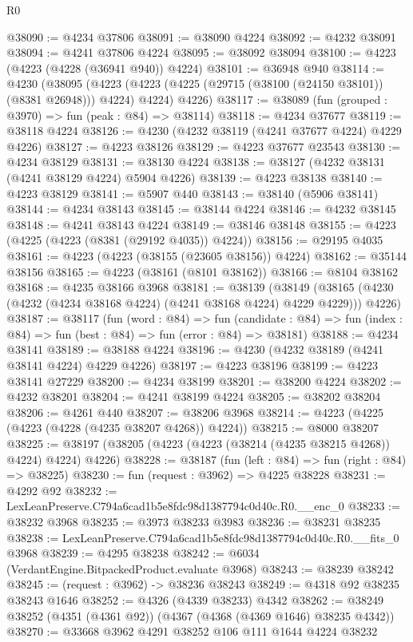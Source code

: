 \begin{lexlean}{R0}
\begin{coremodule}
@38090 := @4234 @37806
@38091 := @38090 @4224
@38092 := @4232 @38091
@38094 := @4241 @37806 @4224
@38095 := @38092 @38094
@38100 := @4223 (@4223 (@4228 (@36941 @940)) @4224)
@38101 := @36948 @940
@38114 := @4230
    (@38095
      (@4223 (@4223 (@4225 (@29715 (@38100 (@24150 @38101)) (@8381 @26948))) @4224) @4224)
      @4226)
@38117 := @38089 (fun (grouped : @3970) => fun (peak : @84) => @38114)
@38118 := @4234 @37677
@38119 := @38118 @4224
@38126 := @4230 (@4232 @38119 (@4241 @37677 @4224) @4229 @4226)
@38127 := @4223 @38126
@38129 := @4223 @37677 @23543
@38130 := @4234 @38129
@38131 := @38130 @4224
@38138 := @38127 (@4232 @38131 (@4241 @38129 @4224) @5904 @4226)
@38139 := @4223 @38138
@38140 := @4223 @38129
@38141 := @5907 @440
@38143 := @38140 (@5906 @38141)
@38144 := @4234 @38143
@38145 := @38144 @4224
@38146 := @4232 @38145
@38148 := @4241 @38143 @4224
@38149 := @38146 @38148
@38155 := @4223 (@4225 (@4223 (@8381 (@29192 @4035)) @4224))
@38156 := @29195 @4035
@38161 := @4223 (@4223 (@38155 (@23605 @38156)) @4224)
@38162 := @35144 @38156
@38165 := @4223 (@38161 (@8101 @38162))
@38166 := @8104 @38162
@38168 := @4235 @38166 @3968
@38181 := @38139
    (@38149 (@38165 (@4230 (@4232 (@4234 @38168 @4224) (@4241 @38168 @4224) @4229 @4229))) @4226)
@38187 := @38117
    (fun (word : @84) =>
    fun (candidate : @84) => fun (index : @84) => fun (best : @84) => fun (error : @84) => @38181)
@38188 := @4234 @38141
@38189 := @38188 @4224
@38196 := @4230 (@4232 @38189 (@4241 @38141 @4224) @4229 @4226)
@38197 := @4223 @38196
@38199 := @4223 @38141 @27229
@38200 := @4234 @38199
@38201 := @38200 @4224
@38202 := @4232 @38201
@38204 := @4241 @38199 @4224
@38205 := @38202 @38204
@38206 := @4261 @440
@38207 := @38206 @3968
@38214 := @4223 (@4225 (@4223 (@4228 (@4235 @38207 @4268)) @4224))
@38215 := @8000 @38207
@38225 := @38197 (@38205 (@4223 (@4223 (@38214 (@4235 @38215 @4268)) @4224) @4224) @4226)
@38228 := @38187 (fun (left : @84) => fun (right : @84) => @38225)
@38230 := fun (request : @3962) => @4225 @38228
@38231 := @4292 @92
@38232 := LexLeanPreserve.C794a6cad1b5e8fdc98d1387794c0d40c.R0.__enc_0
@38233 := @38232 @3968
@38235 := @3973 @38233 @3983
@38236 := @38231 @38235
@38238 := LexLeanPreserve.C794a6cad1b5e8fdc98d1387794c0d40c.R0.__fits_0 @3968
@38239 := @4295 @38238
@38242 := @6034 (VerdantEngine.BitpackedProduct.evaluate @3968)
@38243 := @38239 @38242
@38245 := (request : @3962) -> @38236 @38243
@38249 := @4318 @92 @38235 @38243 @1646
@38252 := @4326 (@4339 @38233) @4342
@38262 := @38249 @38252 (@4351 (@4361 @92)) (@4367 (@4368 (@4369 @1646) @38235 @4342))
@38270 := @33668 @3962 @4291 @38252 @106 @111 @1644 @4224 @38232

\end{coremodule}
\end{lexlean}
